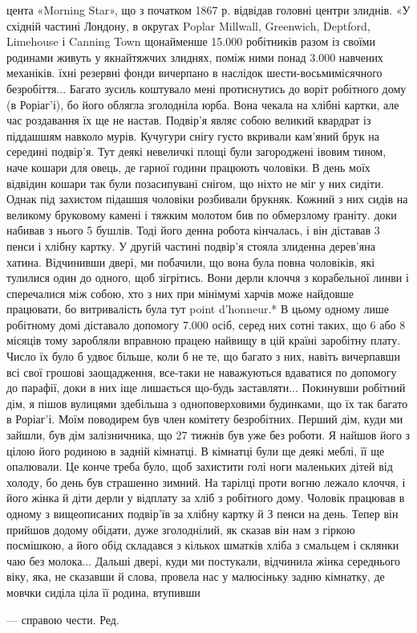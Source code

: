 цента «Morning Star», що з початком 1867 р. відвідав головні
центри злиднів. «У східній частині Лондону, в округах Poplar
Millwall, Greenwich, Deptford, Limehouse і Canning Town щонайменше
15.000 робітників разом із своїми родинами живуть у
якнайтяжчих злиднях, поміж ними понад 3.000 навчених механіків.
їхні резервні фонди вичерпано в наслідок шести-восьмимісячного
безробіття... Багато зусиль коштувало мені протиснутись
до воріт робітного дому (в Роріаг’і), бо його облягла зголодніла
юрба. Вона чекала на хлібні картки, але час роздавання
їх ще не настав. Подвір’я являє собою великий квардрат із
піддашшям навколо мурів. Кучугури снігу густо вкривали
кам’яний брук на середині подвір’я. Тут деякі невеличкі площі
були загороджені івовим тином, наче кошари для овець, де гарної
години працюють чоловіки. В день моїх відвідин кошари так
були позасипувані снігом, що ніхто не міг у них сидіти. Однак
під захистом підашшя чоловіки розбивали брукняк. Кожний з
них сидів на великому бруковому камені і тяжким молотом бив
по обмерзлому ґраніту. доки набивав з нього 5 бушлів. Тоді його
денна робота кінчалась, і він діставав 3 пенси і хлібну картку.
У другій частині подвір’я стояла злиденна дерев’яна хатина.
Відчинивши двері, ми побачили, що вона була повна чоловіків,
які тулилися один до одного, щоб зігрітись. Вони дерли клоччя
з корабельної линви і сперечалися між собою, хто з них при мінімумі
харчів може найдовше працювати, бо витривалість була
тут point d’honneur.* В цьому одному лише робітному домі діставало
допомогу 7.000 осіб, серед них сотні таких, що 6 або 8 місяців
тому заробляли вправною працею найвищу в цій країні
заробітну плату. Число їх було б удвоє більше, коли б не те,
що багато з них, навіть вичерпавши всі свої грошові заощадження,
все-таки не наважуються вдаватися по допомогу до парафії,
доки в них іще лишається що-будь заставляти... Покинувши робітний
дім, я пішов вулицями здебільша з одноповерховими будинками,
що їх так багато в Роріаг’і. Моїм поводирем був член
комітету безробітних. Перший дім, куди ми зайшли, був дім
залізничника, що 27 тижнів був уже без роботи. Я найшов його
з цілою його родиною в задній кімнатці. В кімнатці були ще
деякі меблі, її ще опалювали. Це конче треба було, щоб захистити
голі ноги маленьких дітей від холоду, бо день був страшенно
зимний. На тарілці проти вогню лежало клоччя, і його жінка
й діти дерли у відплату за хліб з робітного дому. Чоловік працював
в одному з вищеописаних подвір’їв за хлібну картку й
З пенси на день. Тепер він прийшов додому обідати, дуже зголоднілий,
як сказав він нам з гіркою посмішкою, а його обід
складався з кількох шматків хліба з смальцем і склянки чаю
без молока... Дальші двері, куди ми постукали, відчинила жінка
середнього віку, яка, не сказавши й слова, провела нас у малюсіньку
задню кімнатку, де мовчки сиділа ціла її родина, втупивши

— справою чести. Ред.
